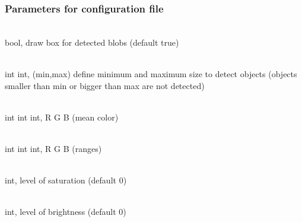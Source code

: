 \subsubsection{Parameters for configuration file}
\label{sec:ocd:howto:params}
    \begin{description} \itemindent=-15pt
        \item[box] \hfill \\ bool, draw box for detected blobs 
            (default true)
        \item[area] \hfill \\ int int, (min,max) define minimum and 
            maximum size 
            to detect objects (objects smaller than min or bigger than 
            max are not detected)
        \item[color] \hfill \\ int int int, R G B (mean color)
        \item[wide] \hfill \\ int int int, R G B (ranges)
        \item[saturation] \hfill \\ int, level of saturation (default 0)
        \item[brightness] \hfill \\ int, level of brightness (default 0)
    \end{description}

